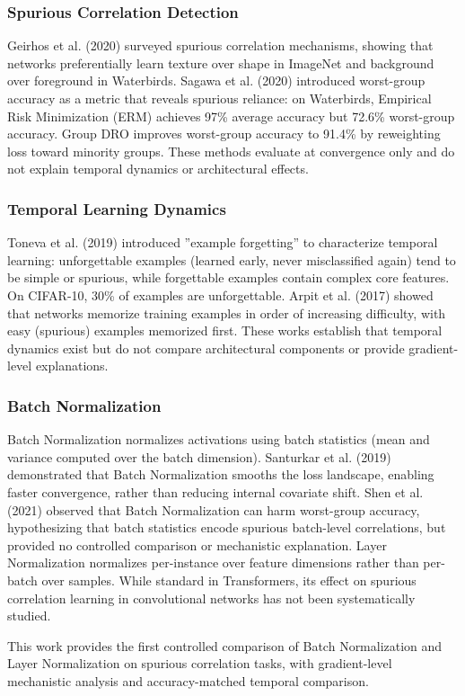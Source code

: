 
\subsubsection{Spurious Correlation Detection}

Geirhos et al. (2020) surveyed spurious correlation mechanisms, showing that networks preferentially learn texture over shape in ImageNet and background over foreground in Waterbirds. Sagawa et al. (2020) introduced worst-group accuracy as a metric that reveals spurious reliance: on Waterbirds, Empirical Risk Minimization (ERM) achieves 97\% average accuracy but 72.6\% worst-group accuracy. Group DRO improves worst-group accuracy to 91.4\% by reweighting loss toward minority groups. These methods evaluate at convergence only and do not explain temporal dynamics or architectural effects.

\subsubsection{Temporal Learning Dynamics}

Toneva et al. (2019) introduced ''example forgetting'' to characterize temporal learning: unforgettable examples (learned early, never misclassified again) tend to be simple or spurious, while forgettable examples contain complex core features. On CIFAR-10, 30\% of examples are unforgettable. Arpit et al. (2017) showed that networks memorize training examples in order of increasing difficulty, with easy (spurious) examples memorized first. These works establish that temporal dynamics exist but do not compare architectural components or provide gradient-level explanations.

\subsubsection{Batch Normalization}

Batch Normalization \citep{Ioffe2015Batch} normalizes activations using batch statistics (mean and variance computed over the batch dimension). Santurkar et al. (2019) demonstrated that Batch Normalization smooths the loss landscape, enabling faster convergence, rather than reducing internal covariate shift. Shen et al. (2021) observed that Batch Normalization can harm worst-group accuracy, hypothesizing that batch statistics encode spurious batch-level correlations, but provided no controlled comparison or mechanistic explanation. Layer Normalization \citep{Ba2016Layer} normalizes per-instance over feature dimensions rather than per-batch over samples. While standard in Transformers, its effect on spurious correlation learning in convolutional networks has not been systematically studied.

This work provides the first controlled comparison of Batch Normalization and Layer Normalization on spurious correlation tasks, with gradient-level mechanistic analysis and accuracy-matched temporal comparison.
